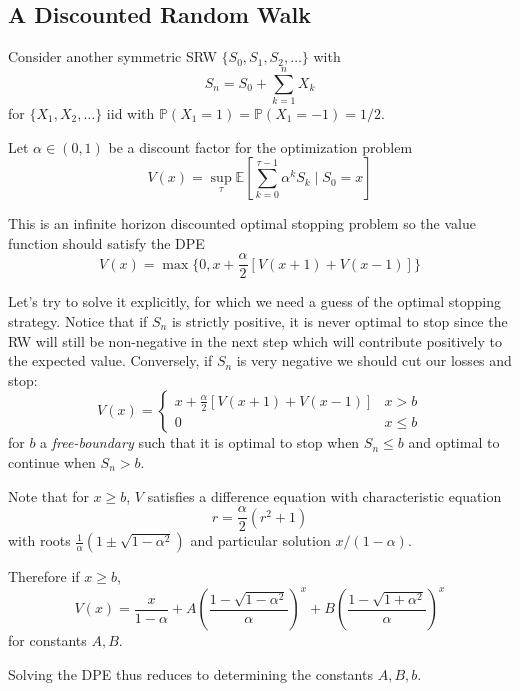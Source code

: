 \documentclass[12pt]{report}
\renewcommand{\P}{\mathbb{P}}
\newcommand{\E}{\mathbb{E}}
\begin{document}
\subsection*{A Discounted Random Walk}
    Consider another symmetric SRW $\{S_0, S_1, S_2, \dots\}$ with 
    \[S_n = S_0 + \sum_{k=1}^{n} X_k\] 
    for $\{X_1, X_2, \dots\}$ iid with $\P(X_1 = 1) = \P(X_1 = -1) = 1/2$.

    Let $\alpha \in (0, 1)$ be a discount factor for the optimization problem 
    \[V(x) = \sup_{\tau} \E[\sum_{k=0}^{\tau - 1} \alpha^k S_k \; | \; S_0 = x]\]

    This is an infinite horizon discounted optimal stopping problem so the value function should satisfy the DPE 
    \[V(x) = \max\{0, x + \frac{\alpha}{2} [V(x + 1) + V(x - 1)]\}\]

    Let's try to solve it explicitly, for which we need a guess of the optimal stopping strategy. Notice that if $S_n$ is strictly positive, it is never optimal to stop since the RW will still be non-negative in the next step which will contribute positively to the expected value. Conversely, if $S_n$ is very negative we should cut our losses and stop:
    \[V(x) = \begin{cases}
        x + \frac{\alpha}{2} [V(x + 1) + V(x - 1)] & x > b\\ 
        0 & x \leq b
    \end{cases}\] 
    for $b$ a \emph{free-boundary} such that it is optimal to stop when $S_n \leq b$ and optimal to continue when $S_n > b$. 

    Note that for $x \geq b$, $V$ satisfies a difference equation with characteristic equation 
    \[r = \frac{\alpha}{2}(r^2 + 1)\]
    with roots $\frac{1}{\alpha}(1 \pm \sqrt{1 - \alpha^2})$ and particular solution $x/(1 - \alpha)$. 

    Therefore if $x \geq b$, 
    \[V(x) = \frac{x}{1 - \alpha} + A\left(\frac{1 - \sqrt{1 - \alpha^2}}{\alpha}\right)^x + B\left(\frac{1 - \sqrt{1 + \alpha^2}}{\alpha}\right)^x\]
    for constants $A, B$. 

    Solving the DPE thus reduces to determining the constants $A, B, b$. 
\end{document}
